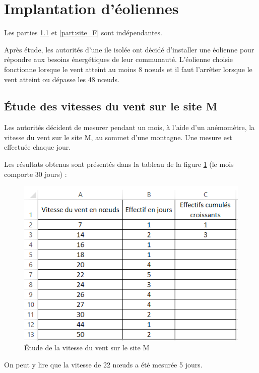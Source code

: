 \section{Implantation d'éoliennes}

Les parties \ref{part:site_M} et \ref{part:site_F} sont indépendantes.

Après étude, les autorités d'une ile isolée ont décidé d'installer une éolienne pour répondre aux besoins énergétiques de leur communauté. L'éolienne choisie fonctionne lorsque le vent atteint au moins 8 n\oe uds et il faut l'arrêter lorsque le vent atteint ou dépasse les 48 n\oe uds. 

\subsection{\'Etude des vitesses du vent sur le site M}\label{part:site_M}

Les autorités décident de mesurer pendant un mois, à l'aide d'un anémomètre, la vitesse du vent sur le site M, au sommet d'une montagne. Une mesure est effectuée chaque jour.

Les résultats obtenus sont présentés dans la tableau de la figure \ref{tab:site_M} (le mois comporte 30 jours) :

\begin{figure}[h]
	\begin{center}
		\includegraphics[scale=0.8]{eoliennes2}
	\end{center}
\caption{\'Etude de la vitesse du vent sur le site M}
\label{tab:site_M}
\end{figure}

On peut y lire que la vitesse de 22 n\oe uds a été mesurée 5 jours.

